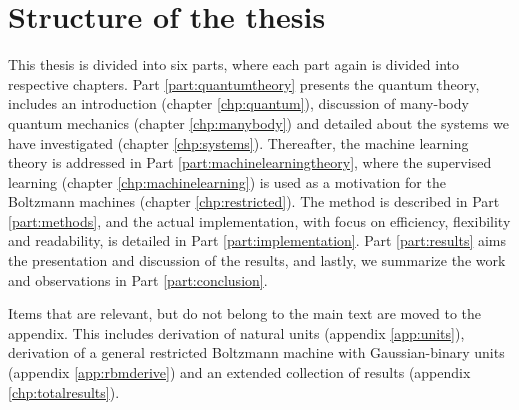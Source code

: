 \section{Structure of the thesis}
This thesis is divided into six parts, where each part again is divided into respective chapters. Part \ref{part:quantumtheory} presents the quantum theory, includes an introduction (chapter \ref{chp:quantum}), discussion of many-body quantum mechanics (chapter \ref{chp:manybody}) and detailed about the systems we have investigated (chapter \ref{chp:systems}). Thereafter, the machine learning theory is addressed in Part \ref{part:machinelearningtheory}, where the supervised learning (chapter \ref{chp:machinelearning}) is used as a motivation for the Boltzmann machines (chapter \ref{chp:restricted}). The method is described in Part \ref{part:methods}, and the actual implementation, with focus on efficiency, flexibility and readability, is detailed in Part \ref{part:implementation}. Part \ref{part:results} aims the presentation and discussion of the results, and lastly, we summarize the work and observations in Part \ref{part:conclusion}.

Items that are relevant, but do not belong to the main text are moved to the appendix. This includes derivation of natural units (appendix \ref{app:units}), derivation of a general restricted Boltzmann machine with Gaussian-binary units (appendix \ref{app:rbmderive}) and an extended collection of results (appendix \ref{chp:totalresults}).
